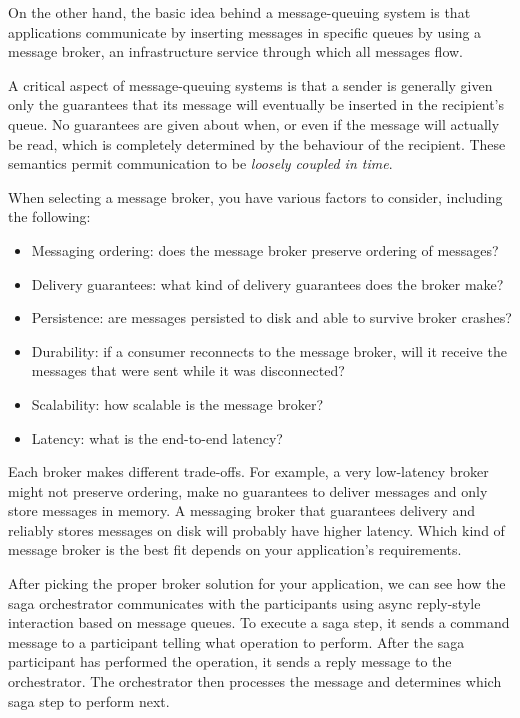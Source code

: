 \documentclass[conference]{IEEEtran}
\begin{document}
On the other hand, the basic idea behind a message-queuing system is that applications communicate by inserting messages in specific queues by using a message broker, an infrastructure service through which all messages flow.

A critical aspect of message-queuing systems is that a sender is generally given only the guarantees that its message will eventually be inserted in the recipient’s queue. No guarantees are given about when, or even if the message will actually be read, which is completely determined by the behaviour of the recipient. These semantics permit communication to be \textit{loosely coupled in time}.

When selecting a message broker, you have various factors to consider, including the following:

\begin{itemize}
  \item Messaging ordering: does the message broker preserve ordering of messages?
  \item Delivery guarantees: what kind of delivery guarantees does the broker make?
  \item Persistence: are messages persisted to disk and able to survive broker crashes?
  \item Durability: if a consumer reconnects to the message broker, will it receive the messages that were sent while it was disconnected?
  \item Scalability: how scalable is the message broker?
  \item Latency: what is the end-to-end latency?
\end{itemize}

Each broker makes different trade-offs. For example, a very low-latency broker might not preserve ordering, make no guarantees to deliver messages and only store messages in memory. A messaging broker that guarantees delivery and reliably stores messages on disk will probably have higher latency. Which kind of message broker is the best fit depends on your application’s requirements. \cite{microservices-patterns-broker}

After picking the proper broker solution for your application, we can see how the saga orchestrator communicates with the participants using async reply-style interaction based on message queues. To execute a saga step, it sends a command message to a participant telling what operation to perform. After the saga participant has performed the operation, it sends a reply message to the orchestrator. The orchestrator then processes the message and determines which saga step to perform next.
\end{document}
